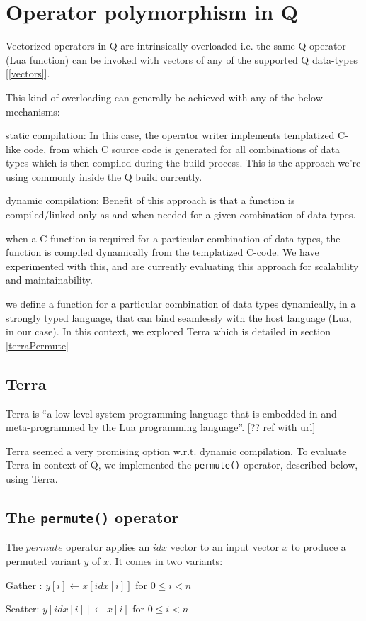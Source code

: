 \section{Operator polymorphism in Q}

Vectorized operators in Q are intrinsically overloaded i.e. the same Q operator (Lua function) can be invoked with vectors of any of the supported Q data-types [\ref{vectors}].

This kind of overloading can generally be achieved with any of the below mechanisms:
\be
\item static compilation: In this case, the operator writer implements templatized C-like code, from which C source code is generated for all combinations of data types which is then compiled during the build process. This is the approach we're using commonly inside the Q build currently.
\item dynamic compilation: Benefit of this approach is that a function is compiled/linked only as and when needed for a given combination of data types. 
\be
\item when a C function is required for a particular combination of data types, the function is compiled dynamically from the templatized C-code. We have experimented with this, and are currently evaluating this approach for scalability and maintainability.
\item we define a function for a particular combination of data types dynamically, in a strongly typed language, that can bind seamlessly with the host language (Lua, in our case).
In this context, we explored Terra which is detailed in section \ref{terraPermute}
\ee
\ee

\subsection{Terra} 
Terra is ``a low-level system programming language that is embedded in and meta-programmed by the Lua programming language''. [?? ref with url] 

Terra seemed a very promising option w.r.t. dynamic compilation. To evaluate Terra in context of Q, we implemented the {\tt permute()} operator, described below, using Terra.

\subsection{The {\tt permute()} operator} 
The \(permute\) operator applies an \(idx\) vector to an input vector \(x\) to produce a permuted variant \(y\) of \(x\). 
It comes in two variants:
\be
\item Gather : \(y[i] \leftarrow x[idx[i]]\) for  \(0 \leq i < n\)
\item Scatter:  \(y[idx[i]] \leftarrow x[i]\) for  \(0 \leq i < n\)
\ee

